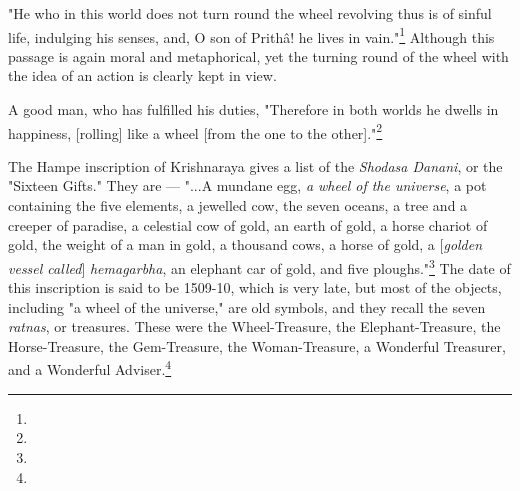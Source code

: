 \documentclass[a4paper, 11pt, oneside, polutonikogreek, english]{article}
\begin{document}
"He who in this world does not turn round the wheel revolving thus is of sinful life, indulging his senses, and, O son of Prithâ! he lives in vain."\footnote{} Although this passage is again moral and metaphorical, yet the turning round of the wheel with the idea of an action is clearly kept in view.

A good man, who has fulfilled his duties, "Therefore in both worlds he dwells in happiness, [rolling] like a wheel [from the one to the other]."\footnote{}

The Hampe inscription of Krishnaraya gives a list of the \emph{Shodasa Danani}, or the "Sixteen Gifts." They are --- "...A mundane egg, \emph{a wheel of the universe}, a pot containing the five elements, a jewelled cow, the seven oceans, a tree and a creeper of paradise, a celestial cow of gold, an earth of gold, a horse chariot of gold, the weight of a man in gold, a thousand cows, a horse of gold, a [\emph{golden vessel called}] \emph{hemagarbha}, an elephant car of gold, and five ploughs."\footnote{} The date of this inscription is said to be 1509-10, which is very late, but most of the objects, including "a wheel of the universe," are old symbols, and they recall the seven \emph{ratnas}, or treasures. These were the Wheel-Treasure, the Elephant-Treasure, the Horse-Treasure, the Gem-Treasure, the Woman-Treasure, a Wonderful Treasurer, and a Wonderful Adviser.\footnote{}
\end{document}

